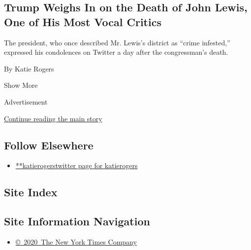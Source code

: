 \begin{enumerate}
  \hypertarget{trump-weighs-in-on-the-death-of-john-lewis-one-of-his-most-vocal-critics}{%
  \subsection{Trump Weighs In on the Death of John Lewis, One of His
  Most Vocal
  Critics}\label{trump-weighs-in-on-the-death-of-john-lewis-one-of-his-most-vocal-critics}}

  The president, who once described Mr. Lewis's district as ``crime
  infested,'' expressed his condolences on Twitter a day after the
  congressman's death.

  By Katie Rogers
\end{enumerate}

Show More

Advertisement

\protect\hyperlink{after-mid2}{Continue reading the main story}

\hypertarget{follow-elsewhere}{%
\subsection{Follow Elsewhere}\label{follow-elsewhere}}

\begin{itemize}
\tightlist
\item
  \href{https://twitter.com/katierogers}{**katierogerstwitter page for
  katierogers}
\end{itemize}

\hypertarget{site-index}{%
\subsection{Site Index}\label{site-index}}

\hypertarget{site-information-navigation}{%
\subsection{Site Information
Navigation}\label{site-information-navigation}}

\begin{itemize}
\tightlist
\item
  \href{https://help.nytimes.com/hc/en-us/articles/115014792127-Copyright-notice}{©~2020~The
  New York Times Company}
\end{itemize}

